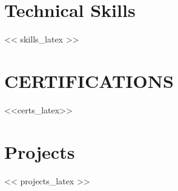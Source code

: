 \documentclass[letterpaper,11pt]{article}
\begin{document}
\section*{Technical Skills}
<< skills_latex >>




\section{CERTIFICATIONS}
<<certs_latex>>

\section*{Projects}
<< projects_latex >>
\end{document}
